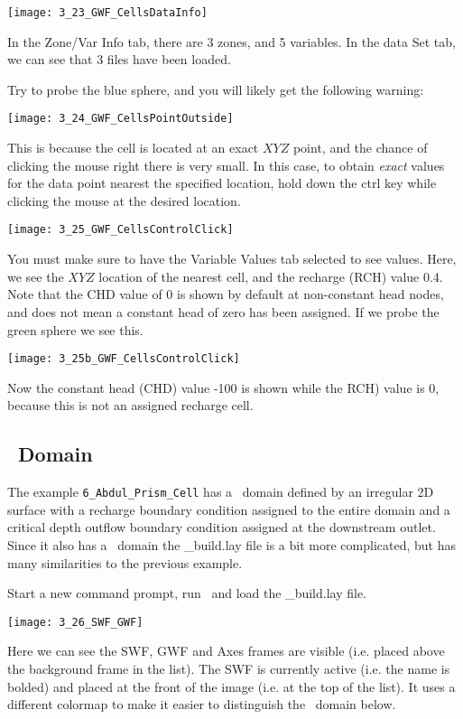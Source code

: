        \texttt{[image: 3\_23\_GWF\_CellsDataInfo]}

In the {\sf Zone/Var Info} tab, there are 3 zones, and 5 variables.  In the {\sf data Set} tab, we can see that 3 files have been loaded.

Try to probe the blue sphere, and you will likely get the following warning:

       \texttt{[image: 3\_24\_GWF\_CellsPointOutside]}

This is because the cell is located at an exact $XYZ$ point, and the chance of clicking the mouse right there is very small.  In this case, to obtain {\it exact} values for the data point nearest the specified location, hold down the {\sf ctrl} key while clicking the mouse at the desired location.

       \texttt{[image: 3\_25\_GWF\_CellsControlClick]}

You must make sure to have the {\sf Variable Values} tab selected to see values. Here, we see the $XYZ$ location of the nearest cell, and the recharge ({\sf RCH}) value 0.4.  Note that the {\sf CHD} value of 0 is shown by default at non-constant head nodes, and does not mean a constant head of zero has been assigned.   If we  probe the green sphere we see this.

       \texttt{[image: 3\_25b\_GWF\_CellsControlClick]}

Now the constant head ({\sf CHD}) value -100 is shown while the {\sf RCH}) value is 0, because this is not an assigned recharge cell.

\subsection{\swf\ Domain}
The  example \texttt{6\_Abdul\_Prism\_Cell} has a \swf\ domain defined by an irregular 2D surface with a recharge boundary condition assigned to the entire domain and a critical depth outflow boundary condition assigned at the downstream outlet. Since it also has a \gwf\ domain the {\sf \_build.lay} file is a bit more complicated, but has many similarities to  the previous example.

Start a new command prompt, run \tecplot\ and load the {\sf \_build.lay} file.

        \texttt{[image: 3\_26\_SWF\_GWF]}

Here we can see the {\sf SWF, GWF} and {\sf Axes} frames are visible (i.e. placed above the {\sf background} frame in the list).  The {\sf SWF} is currently active (i.e. the name is bolded) and placed at the front of the image (i.e. at the top of the list). It uses a different colormap to make it easier to distinguish the \gwf\ domain below.

